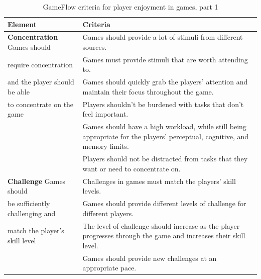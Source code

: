 \begin{table} [H]
\centering
\begin{tabular}{|>{\raggedright}p{}|p{}|}
\hline
\textbf{Element} & \textbf{Criteria} \\ \hline
\textbf{Concentration} Games should & Games should provide a lot of stimuli from different sources. \\ \cline{2-2}
require concentration  & Games must provide stimuli that are worth attending to. \\ \cline{2-2}
and the player should be able & Games should quickly grab the players' attention and maintain their focus throughout the game. \\ \cline{2-2}
to concentrate on the game & Players shouldn't be burdened with tasks that don't feel important. \\ \cline{2-2}
 & Games should have a high workload, while still being appropriate for the players' perceptual, cognitive, and memory limits. \\ \cline{2-2}
& Players should not be distracted from tasks that they want or need to concentrate on.\\ \hline

\textbf{Challenge} Games should  & Challenges in games must match the players' skill levels.\\ \cline{2-2}
be sufficiently challenging and  & Games should provide different levels of challenge for different players. \\ \cline{2-2}
match the player's skill level & The level of challenge should increase as the player progresses through the game and increases their skill level. \\ \cline{2-2}
& Games should provide new challenges at an appropriate pace. \\ \hline
\end{tabular}
\caption[GameFlow criteria for player enjoyment in games, part 1]{GameFlow criteria for player enjoyment in games, part 1 \cite{sweetser}}
\label{tab:gameFlow}
\end{table} 

